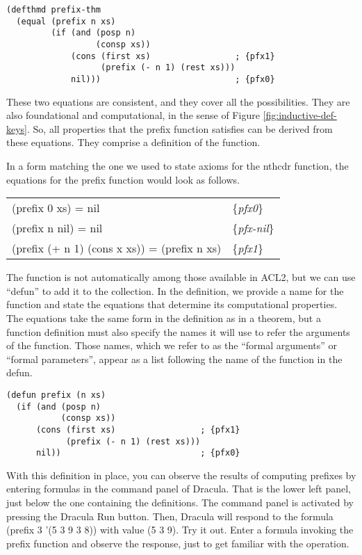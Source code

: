 \begin{lstlisting}
(defthmd prefix-thm
  (equal (prefix n xs)
         (if (and (posp n)
                  (consp xs))
             (cons (first xs)                 ; {pfx1}
                   (prefix (- n 1) (rest xs)))
             nil)))                           ; {pfx0}
\end{lstlisting}

These two equations are consistent, and they cover all the possibilities. They are also foundational and computational, in the sense of Figure \ref{fig:inductive-def-keys}. So, all properties that the prefix function satisfies can be derived from these equations. They comprise a definition of the function.

In a form matching the one we used to state axioms for the nthcdr function, the equations for the prefix function would look as follows.

\label{prefix-equations}
\begin{center}
\begin{tabular}{ll}
(prefix 0 xs) = nil                          & \{\emph{pfx0}\}     \\
(prefix n nil) =  nil                        & \{\emph{pfx-nil}\}  \\
(prefix (+ n 1) (cons x xs)) = (prefix n xs) & \{\emph{pfx1}\}     \\
\end{tabular}
\end{center}

The function is not automatically among those available in ACL2, but we can use ``defun'' to add it to the collection. In the definition, we provide a name for the function and state the equations that determine its computational properties. The equations take the same form in the definition as in a theorem, but a function definition must also specify the names it will use to refer the arguments of the function. Those names, which we refer to as the ``formal arguments'' or ``formal parameters'', appear as a list following the name of the function in the defun.

\begin{lstlisting}
(defun prefix (n xs)
  (if (and (posp n)
           (consp xs))
      (cons (first xs)                 ; {pfx1}
            (prefix (- n 1) (rest xs)))
      nil))                            ; {pfx0}
\end{lstlisting}

With this definition in place, you can observe the results of computing prefixes by entering formulas in the command panel of Dracula. That is the lower left panel, just below the one containing the definitions. The command panel is activated by pressing the Dracula Run button. Then, Dracula will respond to the formula (prefix 3 '(5 3 9 3 8)) with value (5 3 9). Try it out. Enter a formula invoking the prefix function and observe the response, just to get familiar with the operation.

